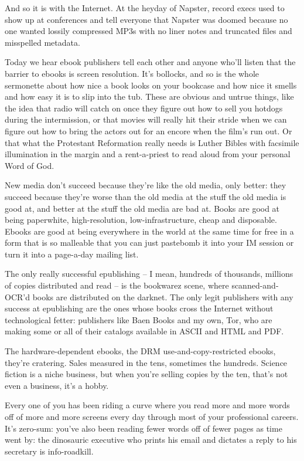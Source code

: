 And so it is with the Internet. At the heyday of Napster, record
execs used to show up at conferences and tell everyone that Napster
was doomed because no one wanted lossily compressed MP3s with no
liner notes and truncated files and misspelled metadata.

Today we hear ebook publishers tell each other and anyone who'll
listen that the barrier to ebooks is screen resolution. It's
bollocks, and so is the whole sermonette about how nice a book
looks on your bookcase and how nice it smells and how easy it is to
slip into the tub. These are obvious and untrue things, like the
idea that radio will catch on once they figure out how to sell you
hotdogs during the intermission, or that movies will really hit
their stride when we can figure out how to bring the actors out for
an encore when the film's run out. Or that what the Protestant
Reformation really needs is Luther Bibles with facsimile
illumination in the margin and a rent-a-priest to read aloud from
your personal Word of God.

New media don't succeed because they're like the old media, only
better: they succeed because they're worse than the old media at
the stuff the old media is good at, and better at the stuff the old
media are bad at. Books are good at being paperwhite,
high-resolution, low-infrastructure, cheap and disposable. Ebooks
are good at being everywhere in the world at the same time for free
in a form that is so malleable that you can just pastebomb it into
your IM session or turn it into a page-a-day mailing list.

The only really successful epublishing -- I mean, hundreds of
thousands, millions of copies distributed and read -- is the
bookwarez scene, where scanned-and-OCR'd books are distributed on
the darknet. The only legit publishers with any success at
epublishing are the ones whose books cross the Internet without
technological fetter: publishers like Baen Books and my own, Tor,
who are making some or all of their catalogs available in ASCII and
HTML and PDF.

The hardware-dependent ebooks, the DRM use-and-copy-restricted
ebooks, they're cratering. Sales measured in the tens, sometimes
the hundreds. Science fiction is a niche business, but when you're
selling copies by the ten, that's not even a business, it's a
hobby.

Every one of you has been riding a curve where you read more and
more words off of more and more screens every day through most of
your professional careers. It's zero-sum: you've also been reading
fewer words off of fewer pages as time went by: the dinosauric
executive who prints his email and dictates a reply to his
secretary is info-roadkill.

